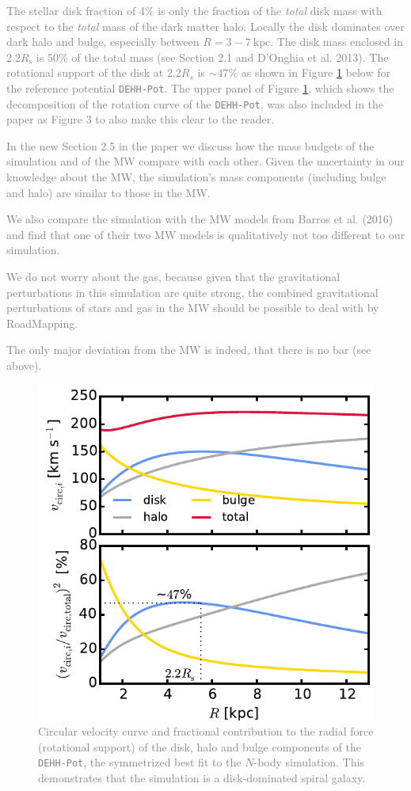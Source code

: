 \documentclass[10pt,a4paper]{article}
\newcommand{\Answer}[1]{\textcolor{Gray}{#1}}
\begin{document}
\Answer{The stellar disk fraction of 4\% is only the fraction of the \emph{total} disk mass with respect to the \emph{total} mass of the dark matter halo. Locally the disk dominates over dark halo and bulge, especially between $R=3-7~\text{kpc}$. The disk mass enclosed in $2.2R_\text{s}$ is 50\% of the total mass (see Section 2.1 and D'Onghia et al. 2013). The rotational support of the disk at $2.2R_s$ is $\sim47\%$ as shown in Figure \ref{fig:rot_support} below for the reference potential \texttt{DEHH-Pot}. The upper panel of Figure \ref{fig:rot_support}, which shows the decomposition of the rotation curve of the \texttt{DEHH-Pot}, was also included in the paper as Figure 3 to also make this clear to the reader.}

\Answer{In the new Section 2.5 in the paper we discuss how the mass budgets of the simulation and of the MW compare with each other. Given the uncertainty in our knowledge about the MW, the simulation's mass components (including bulge and halo) are similar to those in the MW.}

\Answer{We also compare the simulation with the MW models from Barros et al. (2016) and find that one of their two MW models is qualitatively not too different to our simulation.}

\Answer{We do not worry about the gas, because given that the gravitational perturbations in this simulation are quite strong, the combined gravitational perturbations of stars and gas in the MW should be possible to deal with by RoadMapping.}

\Answer{The only major deviation from the MW is indeed, that there is no bar (see above).}

\begin{figure}[!htbp]
\centering
\includegraphics[width=0.7\columnwidth]{fig/plot_vcirc_decomposed.pdf}
\caption{\Answer{Circular velocity curve and fractional contribution to the radial force (rotational support) of the disk, halo and bulge components of the \texttt{DEHH-Pot}, the symmetrized best fit to the $N$-body simulation. This demonstrates that the simulation is a disk-dominated spiral galaxy.}}
\label{fig:rot_support}
\end{figure}
\end{document}
